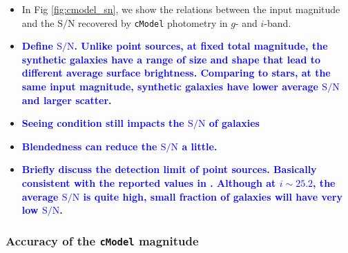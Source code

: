 \documentclass[useamsfonts]{pasj01}
\def\cmodel{\texttt{cModel}}
\newcommand{\plan}[1]{\textcolor{blue} {\textbf{#1}}}
\begin{document}
    \begin{itemize}
    
        \item In Fig \ref{fig:cmodel_sn}, we show the relations between the input
            magnitude and the $\mathrm{S}/\mathrm{N}$ recovered by \cmodel{}
            photometry in $g$- and $i$-band.
        
        \item \plan{Define $\mathrm{S}/\mathrm{N}$. 
                    Unlike point sources, at fixed total magnitude, the 
                    synthetic galaxies have a range of size and shape that 
                    lead to different average surface brightness. 
                    Comparing to stars, at the same input magnitude, synthetic
                    galaxies have lower average $\mathrm{S}/\mathrm{N}$ and larger 
                    scatter. }
        
        \item \plan{Seeing condition still impacts the $\mathrm{S}/\mathrm{N}$ of
                    galaxies} 
                    
        \item \plan{Blendedness can reduce the $\mathrm{S}/\mathrm{N}$ a little.}        
        
        \item \plan{Briefly discuss the detection limit of point sources. 
            Basically consistent with the reported values in \citet{HSCDR1}.
            Although at $i{\sim}25.2$, the average $\mathrm{S}/\mathrm{N}$ is quite high,
            small fraction of galaxies will have very low $\mathrm{S}/\mathrm{N}$.}
           
    \end{itemize}

\subsubsection{Accuracy of the \cmodel{} magnitude}
\end{document}
